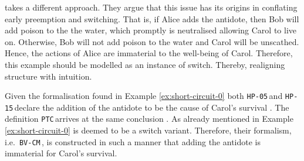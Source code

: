 \documentclass[11pt,a4paper]{book}
\theoremstyle{definition}
\theoremstyle{definition}
\theoremstyle{definition}
\theoremstyle{remark}
\newcommand{\hpu}{\texttt{HP-05}\,}
\newcommand{\ptc}{\texttt{PTC}\,}
\newcommand{\hpm}{\texttt{HP-15}\,}
\newcommand{\bvcm}{\texttt{BV-CM}\,}
\begin{document}
\begin{center}
\end{center}


\parencite{beckers2018principled} takes a different approach. They argue that this issue has its origins in conflating early preemption and switching. 
That is, if Alice adds the antidote, then Bob will add poison to the the water, which promptly is neutralised allowing Carol to live on.
Otherwise, Bob will not add poison to the water and Carol will be unscathed. Hence, the actions of Alice are immaterial to the well-being of Carol.
Therefore, this example should be modelled as an instance of switch. Thereby, realigning structure with intuition.



Given the formalisation found in Example \ref{ex:short-circuit-0} both \hpu and \hpm declare the addition of the antidote to be the cause of Carol's survival \parencite[p.~90]{halpern2016actual}. 
The definition \ptc arrives at the same conclusion \parencite{weslake2015partial}.  
As already mentioned  in \parencite{beckers2018principled} Example \ref{ex:short-circuit-0} is deemed to be a switch variant. Therefore, their formalism, i.e.\ \bvcm, is constructed in such a manner that adding the antidote is immaterial for Carol's survival.
\end{document}
